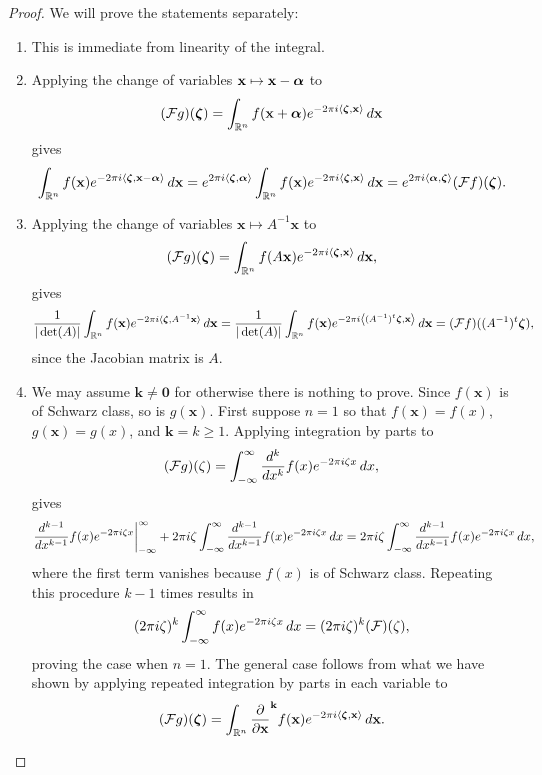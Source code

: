       \begin{proof}
        We will prove the statements separately:
        \begin{enumerate}[label*=(\roman*)]
          \item This is immediate from linearity of the integral.
          \item Applying the change of variables $\mathbf{x} \mapsto \mathbf{x}-\boldsymbol{\alpha}$ to
          \[
            (\mathcal{F}g)(\boldsymbol{\zeta}) = \int_{\mathbb{R}^{n}}f(\mathbf{x}+\boldsymbol{\alpha})e^{-2\pi i\langle\boldsymbol{\zeta},\mathbf{x}\rangle}\,d\mathbf{x}
          \]
          gives
          \[
            \int_{\mathbb{R}^{n}}f(\mathbf{x})e^{-2\pi i\langle\boldsymbol{\zeta},\mathbf{x}-\boldsymbol{\alpha}\rangle}\,d\mathbf{x} = e^{2\pi i\langle\boldsymbol{\zeta},\boldsymbol{\alpha}\rangle}\int_{\mathbb{R}^{n}}f(\mathbf{x})e^{-2\pi i\langle\boldsymbol{\zeta},\mathbf{x}\rangle}\,d\mathbf{x} = e^{2\pi i\langle\boldsymbol{\alpha},\boldsymbol{\zeta}\rangle}(\mathcal{F}f)(\boldsymbol{\zeta}).
          \]
          \item Applying the change of variables $\mathbf{x} \mapsto A^{-1}\mathbf{x}$ to
          \[
            (\mathcal{F}g)(\boldsymbol{\zeta}) = \int_{\mathbb{R}^{n}}f(A\mathbf{x})e^{-2\pi i\langle\boldsymbol{\zeta},\mathbf{x}\rangle}\,d\mathbf{x},
          \]
          gives
          \[
            \frac{1}{|\det(A)|}\int_{\mathbb{R}^{n}}f(\mathbf{x})e^{-2\pi i\langle\boldsymbol{\zeta},A^{-1}\mathbf{x}\rangle}\,d\mathbf{x} = \frac{1}{|\det(A)|}\int_{\mathbb{R}^{n}}f(\mathbf{x})e^{-2\pi i\left\langle(A^{-1})^{t}\boldsymbol{\zeta},\mathbf{x}\right\rangle}\,d\mathbf{x} = (\mathcal{F}f)((A^{-1})^{t}\boldsymbol{\zeta}),
          \]
          since the Jacobian matrix is $A$.
          \item We may assume $\mathbf{k} \neq \mathbf{0}$ for otherwise there is nothing to prove. Since $f(\mathbf{x})$ is of Schwarz class, so is $g(\mathbf{x})$. First suppose $n = 1$ so that $f(\mathbf{x}) = f(x)$, $g(\mathbf{x}) = g(x)$, and $\mathbf{k} = k \ge 1$. Applying integration by parts to
          \[
            (\mathcal{F}g)(\zeta) = \int_{-\infty}^{\infty}\frac{d^{k}}{dx^{k}}f(x)e^{-2\pi i\zeta x}\,dx,
          \]
          gives
          \[
            \frac{d^{k-1}}{dx^{k-1}}f(x)e^{-2\pi i\zeta x}\bigg|_{-\infty}^{\infty}+2\pi i\zeta\int_{-\infty}^{\infty}\frac{d^{k-1}}{dx^{k-1}}f(x)e^{-2\pi i\zeta x}\,dx = 2\pi i\zeta\int_{-\infty}^{\infty}\frac{d^{k-1}}{dx^{k-1}}f(x)e^{-2\pi i\zeta x}\,dx,
          \]
          where the first term vanishes because $f(x)$ is of Schwarz class. Repeating this procedure $k-1$ times results in
          \[
            (2\pi i\zeta)^{k}\int_{-\infty}^{\infty}f(x)e^{-2\pi i\zeta x}\,dx = (2\pi i\zeta)^{k}(\mathcal{F})(\zeta),
          \]
          proving the case when $n = 1$. The general case follows from what we have shown by applying repeated integration by parts in each variable to
          \[
            (\mathcal{F}g)(\boldsymbol{\zeta}) = \int_{\mathbb{R}^{n}}\frac{\partial}{\partial \mathbf{x}}^{\mathbf{k}}f(\mathbf{x})e^{-2\pi i\langle\boldsymbol{\zeta},\mathbf{x}\rangle}\,d\mathbf{x}.
          \]
        \end{enumerate}
      \end{proof}

